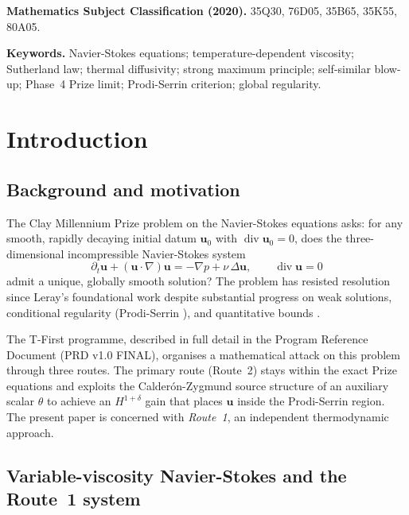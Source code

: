 \documentclass[12pt]{article}
\newcommand{\Div}{\operatorname{div}}
\newcommand{\p}{\partial}
\newcommand{\grad}{\nabla}
\newcommand{\Lap}{\Delta}
\begin{document}
\bigskip
\noindent\textbf{Mathematics Subject Classification (2020).}
35Q30, 76D05, 35B65, 35K55, 80A05.

\bigskip
\noindent\textbf{Keywords.}
Navier-Stokes equations; temperature-dependent viscosity; Sutherland law; thermal
diffusivity; strong maximum principle; self-similar blow-up; Phase~4 Prize limit;
Prodi-Serrin criterion; global regularity.

\newpage
\tableofcontents
\newpage

\section{Introduction}
\label{sec:intro}

\subsection{Background and motivation}
\label{ssec:background}

The Clay Millennium Prize problem on the Navier-Stokes equations
\citep{Fefferman2000} asks: for any smooth, rapidly decaying initial datum
$\mathbf{u}_0$ with $\Div\mathbf{u}_0 = 0$, does the three-dimensional
incompressible Navier-Stokes system
\begin{equation}
  \label{eq:prize-ns}
  \p_t \mathbf{u} + (\mathbf{u}\cdot\grad)\mathbf{u} = -\grad p + \nu\,\Lap\mathbf{u},
  \qquad
  \Div\mathbf{u} = 0
\end{equation}
admit a unique, globally smooth solution?  The problem has resisted resolution since
Leray's foundational work \citep{Leray1934} despite substantial progress on weak
solutions, conditional regularity (Prodi-Serrin \citep{Prodi1959, Serrin1962}), and
quantitative bounds \citep{Tao2016}.

The T-First programme, described in full detail in the Program Reference Document
(PRD v1.0 FINAL), organises a mathematical attack on this problem through three
routes.  The primary route (Route~2) stays within the exact Prize equations and
exploits the Calder\'on-Zygmund source structure of an auxiliary scalar $\theta$ to
achieve an $H^{1+\delta}$ gain that places $\mathbf{u}$ inside the Prodi-Serrin
region.  The present paper is concerned with \emph{Route~1}, an independent
thermodynamic approach.

\subsection{Variable-viscosity Navier-Stokes and the Route~1 system}
\label{ssec:var-visc}
\end{document}

